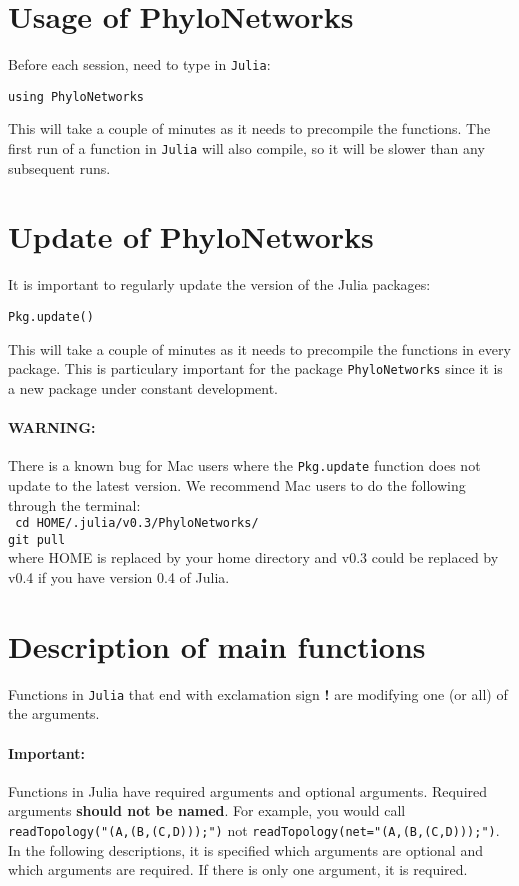 \documentclass[12pt]{article}
\begin{document}
\section{Usage of PhyloNetworks}
Before each session, need to type in \texttt{Julia}:

\begin{lstlisting}
using PhyloNetworks
\end{lstlisting}

This will take a couple of minutes as it needs to precompile the
functions.  The first run of a function in \texttt{Julia} will also
compile, so it will be slower than any subsequent runs.

\section{Update of PhyloNetworks}
It is important to regularly update the version of the Julia packages:

\begin{lstlisting}
Pkg.update()
\end{lstlisting}

This will take a couple of minutes as it needs to precompile the
functions in every package. This is particulary important for the
package \texttt{PhyloNetworks} since it is a new package under constant
development.

\paragraph{WARNING:} There is a known bug for Mac users where the \texttt{Pkg.update} function does not update to the latest version. We recommend Mac users to do the following through the terminal:\\
\texttt{
  cd HOME/.julia/v0.3/PhyloNetworks/ \\
  git pull } \\where HOME is replaced by your home directory and v0.3
could be replaced by v0.4 if you have version 0.4 of Julia.

\section{Description of main functions}
Functions in \texttt{Julia} that end with exclamation sign \textbf{!}
are modifying one (or all) of the arguments.
\paragraph{Important:} Functions in Julia have required arguments and
optional arguments. Required arguments \textbf{should not be
  named}. For example, you would call\\
\texttt{readTopology("(A,(B,(C,D)));")} not
\texttt{readTopology(net="(A,(B,(C,D)));")}.
In the following descriptions, it is specified which arguments are
optional and which arguments are required. If there is only one
argument, it is required.
\end{document}
